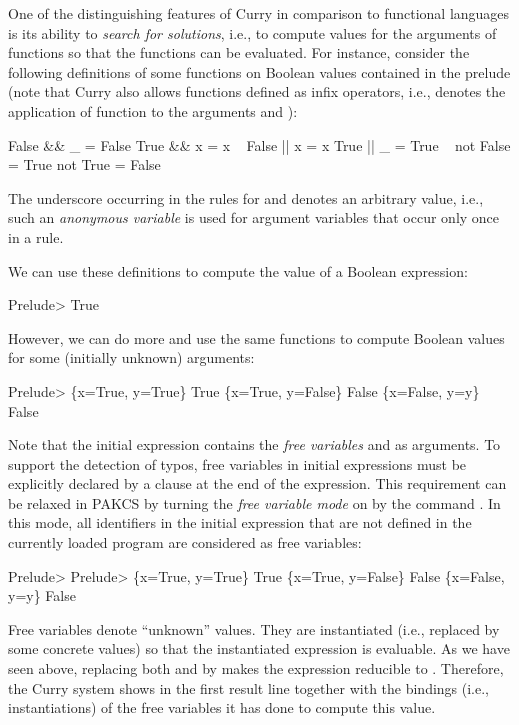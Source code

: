 One of the distinguishing features of Curry in comparison
to functional languages is its ability to \emph{search for solutions},
i.e., to compute values for the arguments of functions so that
the functions can be evaluated.
For instance, consider the following definitions of some functions
on Boolean values contained in the prelude (note that
Curry also allows functions defined as infix operators, i.e.,
 denotes the application of function \code{\&\&}
to the arguments  and ):
\begin{prog}
False \&\& _  =  False
True  \&\& x  =  x
~
False || x  =  x
True  || _  =  True
~
not False   =  True
not True    =  False
\end{prog}
The underscore
\ccode{_}\pindex{_}
occurring in the rules for
\code{\&\&} and \code{||} denotes an arbitrary value,
i.e., such an \emph{anonymous variable} is used for argument
variables that occur only once in a rule.

We can use these definitions to compute the value of a Boolean expression:
\begin{prog}
Prelude> 
True
\end{prog}
However, we can do more and use the same functions
to compute Boolean values for some (initially unknown) arguments:
\begin{prog}
Prelude> 
\{x=True, y=True\} True
\{x=True, y=False\} False
\{x=False, y=y\} False
\end{prog}
Note that the initial expression contains the
\emph{free variables}
 and  as arguments.
To support the detection of typos,
free variables in initial expressions must be explicitly declared
by a  clause at the end of the expression.
This requirement can be relaxed in PAKCS by turning the
\emph{free variable mode} on by the command .
In this mode, all identifiers in the initial expression that
are not defined in the currently loaded program are considered as
free variables:
\begin{prog}
Prelude> 
Prelude> 
\{x=True, y=True\} True
\{x=True, y=False\} False
\{x=False, y=y\} False
\end{prog}
Free variables denote ``unknown'' values.
They are instantiated (i.e., replaced by some concrete values) so that
the instantiated expression is evaluable. As we have seen above,
replacing both  and  by 
makes the expression reducible to . Therefore,
the Curry system shows in the first result line  together with the
bindings (i.e., instantiations) of the free variables
it has done to compute this value.

